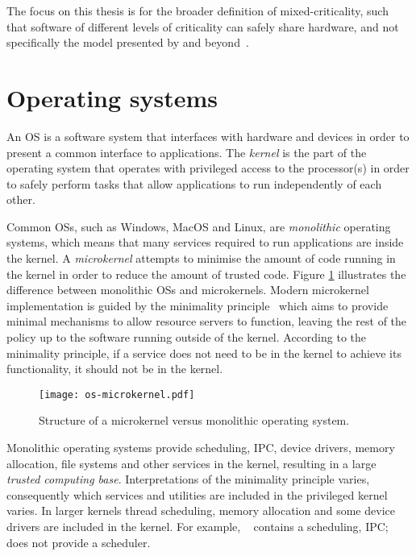 The focus on this thesis is for the broader definition of mixed-criticality, such that software of
different levels of criticality can safely share hardware, and not specifically the model
presented by \citet{Vestal_07} and beyond~\citep{Burns_Davis_17}.

\section{Operating systems}
\label{sec:background-operating-systems}

An \gls{OS} is a software system that interfaces with hardware and devices in order to present a
common interface to applications.  The \emph{kernel} is the part of the operating system that
operates with privileged access to the processor(s) in order to safely perform tasks that allow
applications to run independently of each other.

Common \glspl{OS}, such as Windows, MacOS and Linux, are \emph{monolithic} operating systems,
which means that many services required to run applications are inside the kernel.  A \emph{microkernel}
attempts to minimise the amount of code running in the kernel in order to reduce the amount of
trusted code.  Figure \ref{fig:os-microkernel} illustrates the difference between monolithic
\glspl{OS} and microkernels.  Modern microkernel implementation is guided by the minimality
principle~\citep{Liedtke_95} which aims to provide minimal mechanisms to allow resource servers to
function, leaving the rest of the policy up to the software running outside of the kernel. According
to the minimality principle, if a service does not need to be in the kernel to achieve its
functionality, it should not be in the kernel.

\begin{figure}[tb]
	\begin{center}
		\leavevmode
		\texttt{[image: os-microkernel.pdf]}
		\caption{Structure of a microkernel versus monolithic operating system.}
		\label{fig:os-microkernel}
	\end{center}
\end{figure}

Monolithic operating systems provide scheduling, \gls{IPC}, device drivers, memory allocation, file
systems and other services in the kernel, resulting in a large \emph{trusted computing base}.
Interpretations of the minimality principle varies, 
consequently which services and utilities are included in the privileged kernel varies. In
larger kernels thread scheduling, memory allocation and some device drivers are included in the kernel.
For example, \selfour~\citep{Klein_EHACDEEKNSTW_09} contains a scheduling, \gls{IPC}; 
\composite~\citep{Parmer:phd} does not provide a scheduler. 

